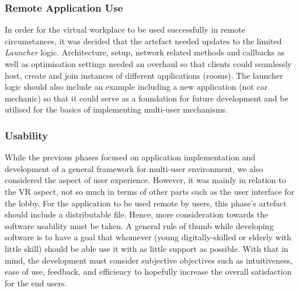 \subsubsection{Remote Application Use}
In order for the virtual workplace to be used successfully in remote circumstances, it was decided that the artefact needed updates to the limited \textit{Launcher} logic. Architecture, setup, network related methods and callbacks as well as optimisation settings needed an overhaul so that clients could seamlessly host, create and join instances of different applications (rooms). The launcher logic should also include an example including a new application (not car mechanic) so that it could serve as a foundation for future development and be utilised for the basics of implementing multi-user mechanisms.   

\subsubsection{Usability}
While the previous phases focused on application implementation and  development of a general framework for multi-user environment, we also considered the aspect of user experience. However, it was mainly in relation to the VR aspect, not so much in terms of other parts such as the user interface for the lobby. For the application to be used remote by users, this phase's artefact should include a distributable file. Hence, more consideration towards the software usability must be taken. A general rule of thumb while developing software is to have a goal that whomever (young digitally-skilled or elderly with little skill) should be able use it with as little support as possible. With that in mind, the development must consider subjective objectives such as intuitiveness, ease of use, feedback, and efficiency to hopefully increase the overall satisfaction for the end users.



